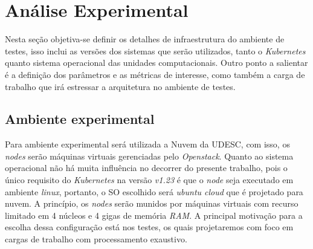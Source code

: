 \documentclass[
	12pt,				%
	openright,			%
	oneside,			%
	a4paper,			%
	brazil				%
	]{abntex2}
\begin{document}

\chapter{Análise Experimental}
Nesta seção objetiva-se definir os detalhes de infraestrutura do ambiente de testes, isso inclui as versões dos sistemas que serão utilizados, tanto o \textit{Kubernetes} quanto sistema operacional das unidades computacionais. Outro ponto a salientar é a definição dos parâmetros e as métricas de interesse, como também a carga de trabalho que irá estressar a arquitetura no ambiente de testes.

\section{Ambiente experimental}
Para ambiente experimental será utilizada a Nuvem da UDESC, com isso, os \textit{nodes} serão máquinas virtuais gerenciadas pelo \textit{Openstack}. Quanto ao sistema operacional não há muita influência no decorrer do presente trabalho, pois o único requisito do \textit{Kubernetes} na versão \textit{v1.23} é que o \textit{node} seja executado em ambiente \textit{linux}, portanto, o \ac{SO} escolhido será \textit{ubuntu cloud} que é projetado para nuvem. A princípio, os \textit{nodes} serão munidos por máquinas virtuais com recurso limitado em 4 núcleos e 4 gigas de memória \textit{RAM}. A principal motivação para a escolha dessa configuração está nos testes, os quais projetaremos com foco em cargas de trabalho com processamento exaustivo.
\end{document}
